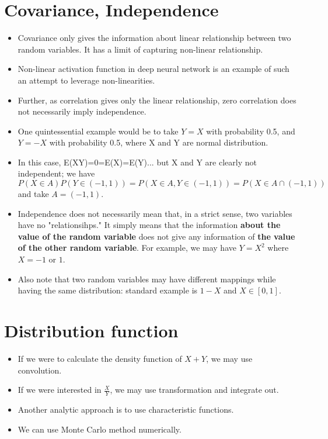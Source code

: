 \documentclass[11pt,reqno]{amsart}
\theoremstyle{remark}
\begin{document}
\section{Covariance, Independence}
\begin{itemize}
\item Covariance only gives the information about linear relationship between two random variables. It has a limit of capturing non-linear relationship.
\item Non-linear activation function in deep neural network is an example of such an attempt to leverage non-linearities.
\item Further, as correlation gives only the linear relationship, zero correlation does not necessarily imply independence.
\item One quintessential example would be to take $Y=X$ with probability 0.5, and $Y=-X$ with probability 0.5, where X and Y are normal distribution.
\item In this case, E(XY)=0=E(X)=E(Y)... but X and Y are clearly not independent; we have
$$
P(X\in A)P(Y\in (-1,1))=P(X\in A, Y\in (-1,1))=P(X\in A\cap (-1,1))
$$
and take $A=(-1,1)$.
\item Independence does not necessarily mean that, in a strict sense, two variables have no "relationsihps." It simply means
that the information \textbf{about the value of the random variable} does not give any information of \textbf{the value of the other random variable}. For example, we may have $Y=X^2$ where $X=-1$ or $1$.
\item Also note that two random variables may have different mappings while having the same distribution: standard example is $1-X$ and $X\in [0,1]$.
\end{itemize}

\section{Distribution function}
\begin{itemize}
\item If we were to calculate the density function of $X+Y$, we may use convolution.
\item If we were interested in $\frac XY$, we may use transformation and integrate out. 
\item Another analytic approach is to use characteristic functions.
\item We can use Monte Carlo method numerically.

\end{itemize}
\end{document}
